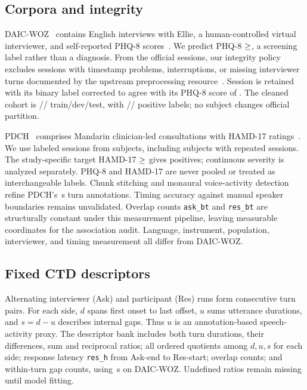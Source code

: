 \documentclass{article}
\begin{document}
\subsection{Corpora and integrity}
DAIC-WOZ~\cite{gratch2014daic} contains English interviews with Ellie, a human-controlled virtual interviewer, and self-reported PHQ-8 scores~\cite{kroenke2009phq8}. We predict PHQ-8 $\geq\R{phqCutoff}$, a screening label rather than a diagnosis. From the official  sessions, our integrity policy excludes  sessions with timestamp problems, interruptions, or missing interviewer turns documented by the upstream preprocessing resource~\cite{baileyDaicProcessing}. Session  is retained with its binary label corrected to agree with its PHQ-8 score of . The cleaned cohort is // train/dev/test, with // positive labels; no subject changes official partition.

PDCH~\cite{cao2025pdch} comprises Mandarin clinician-led consultations with HAMD-17 ratings~\cite{hamilton1960rating}. We use  labeled sessions from  subjects, including  subjects with repeated sessions. The study-specific target HAMD-17 $\geq\R{hamdCutoff}$ gives  positives; continuous severity is analyzed separately. PHQ-8 and HAMD-17 are never pooled or treated as interchangeable labels. Chunk stitching and monaural voice-activity detection refine PDCH's \,s turn annotations. Timing accuracy against manual speaker boundaries remains unvalidated. Overlap counts \texttt{ask\_bt} and \texttt{res\_bt} are structurally constant under this measurement pipeline, leaving  measurable coordinates for the association audit. Language, instrument, population, interviewer, and timing measurement all differ from DAIC-WOZ.

\subsection{Fixed CTD descriptors}
Alternating interviewer (Ask) and participant (Res) runs form consecutive turn pairs. For each side, $d$ spans first onset to last offset, $u$ sums utterance durations, and $s=d-u$ describes internal gaps. Thus $u$ is an annotation-based speech-activity proxy. The descriptor bank includes both turn durations, their differences, sum and reciprocal ratios; all ordered quotients among $d,u,s$ for each side; response latency \texttt{res\_h} from Ask-end to Res-start; overlap counts; and within-turn gap counts, using \,s on DAIC-WOZ. Undefined ratios remain missing until model fitting.
\end{document}
